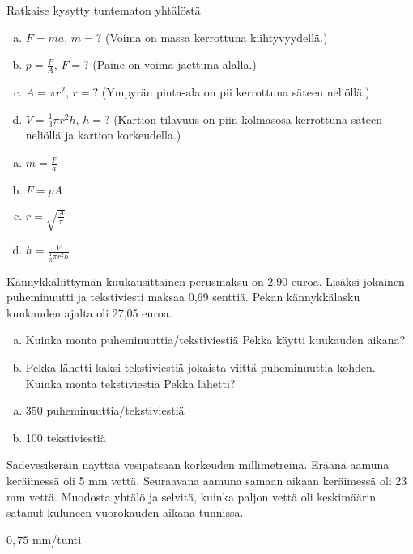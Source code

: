 \begin{tehtava}
Ratkaise kysytty tuntematon yhtälöstä
\begin{enumerate}[a)]
\item $F=ma$, $m=?$ (Voima on massa kerrottuna kiihtyvyydellä.)
\item $p=\frac{F}{A}$, $F=?$ (Paine on voima jaettuna alalla.)
\item $A=\pi r^2$, $r=?$ (Ympyrän pinta-ala on pii kerrottuna säteen neliöllä.)
\item $V=\frac{1}{3} \pi r^2 h$, $h=?$ (Kartion tilavuus on piin kolmasosa
kerrottuna säteen neliöllä ja kartion korkeudella.)
\end{enumerate}
\begin{vastaus}
\begin{enumerate}[a)]
\item $m=\frac{F}{a}$
\item $F=p A$
\item $r=\sqrt{\frac{A}{\pi}}$
\item $h=\frac{V}{ \frac{1}{3} \pi r^2 h}$
\end{enumerate}
\end{vastaus}
\end{tehtava}

\begin{tehtava}
Kännykkäliittymän kuukausittainen perusmaksu on 2,90 euroa. Lisäksi jokainen puheminuutti ja tekstiviesti maksaa 0,69 senttiä. Pekan kännykkälasku kuukauden
ajalta oli 27,05 euroa.

\begin{enumerate}[a)]
	\item Kuinka monta puheminuuttia/tekstiviestiä Pekka käytti kuukauden aikana?
	\item Pekka lähetti kaksi tekstiviestiä jokaista viittä puheminuuttia kohden. Kuinka monta tekstiviestiä Pekka lähetti?
\end{enumerate}

	\begin{vastaus}
		\begin{enumerate}[a)]
			\item 350 puheminuuttia/tekstiviestiä
			\item 100 tekstiviestiä
		\end{enumerate}
	\end{vastaus}
\end{tehtava}

\begin{tehtava}
Sadevesikeräin näyttää vesipatsaan korkeuden millimetreinä. Eräänä aamuna
keräimessä oli 5 mm vettä. Seuraavana aamuna samaan aikaan keräimessä oli 23 mm vettä. Muodosta yhtälö ja selvitä, kuinka paljon vettä oli keskimäärin satanut kuluneen vuorokauden aikana tunnissa.
	\begin{vastaus}
	$0,75$ mm/tunti
	\end{vastaus}
\end{tehtava}
